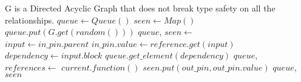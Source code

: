 \documentclass[12pt, varwidth=20cm]{standalone}
\begin{document}
  \begin{algorithmic}[1]
    \Require G is a Directed Acyclic Graph that does not break
    type safety on all the relationships.
      \State $queue \gets Queue()$
      \State $seen \gets Map()$
      \State $queue.put(G.get(random()))$ 
        \State $queue$, $seen \gets$ 
      \EndWhile
    \EndFunction
    \\
        \State $input \gets in\_pin.parent$
          \State $in\_pin.value \gets reference.get(input)$
        \Else
          \State $dependency \gets input.block$
           
            \State $queue.get\_element(dependency)$
          \EndIf
          \State $queue$, $references \gets$ 
        \EndIf
      \EndFor
      \State $current.function()$ 
        \State $seen.put(out\_pin, out\_pin.value)$
      \EndFor
      \State \Return $queue$, $seen$
    \EndFunction
  \end{algorithmic}
\end{document}
